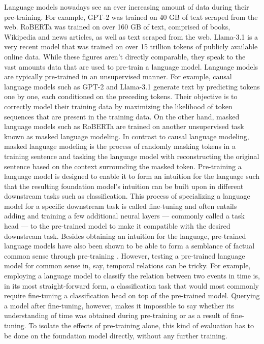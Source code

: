 \documentclass[11pt]{article}
\begin{document}
Language models nowadays see an ever increasing amount of data during their pre-training. For example, GPT-2 \citep{gpt2} was trained on 40 GB of text scraped from the web. RoBERTa \citep{roberta} was trained on over 160 GB of text, comprised of books, Wikipedia and news articles, as well as text scraped from the web. Llama-3.1 \citep{llama3} is a very recent model that was trained on over 15 trillion tokens of publicly available online data. While these figures aren't directly comparable, they speak to the vast amounts data that are used to pre-train a language model. Language models are typically pre-trained in an unsupervised manner. For example, causal language models such as GPT-2 \citep{gpt2} and Llama-3.1 \citep{llama3} generate text by predicting tokens one by one, each conditioned on the preceding tokens. Their objective is to correctly model their training data by maximizing the likelihood of token sequences that are present in the training data. On the other hand, masked language models such as RoBERTa \citep{roberta} are trained on another unsupervised task known as masked language modeling. In contrast to causal language modeling, masked language modeling is the process of randomly masking tokens in a training sentence and tasking the language model with reconstructing the original sentence based on the context surrounding the masked token. Pre-training a language model is designed to enable it to form an intuition for the language such that the resulting foundation model's intuition can be built upon in different downstream tasks such as classification. This process of specializing a language model for a specific downstream task is called fine-tuning and often entails adding and training a few additional neural layers --- commonly called a task head --- to the pre-trained model to make it compatible with the desired downstream task. Besides obtaining an intuition for the language, pre-trained language models have also been shown to be able to form a semblance of factual common sense through pre-training \citet{zhou2020evaluating}. However, testing a pre-trained language model for common sense in, say, temporal relations can be tricky. For example, employing a language model to classify the relation between two events in time is, in its most straight-forward form, a classification task that would most commonly require fine-tuning a classification head on top of the pre-trained model. Querying a model after fine-tuning, however, makes it impossible to say whether its understanding of time was obtained during pre-training or as a result of fine-tuning. To isolate the effects of pre-training alone, this kind of evaluation has to be done on the foundation model directly, without any further training.
\end{document}
